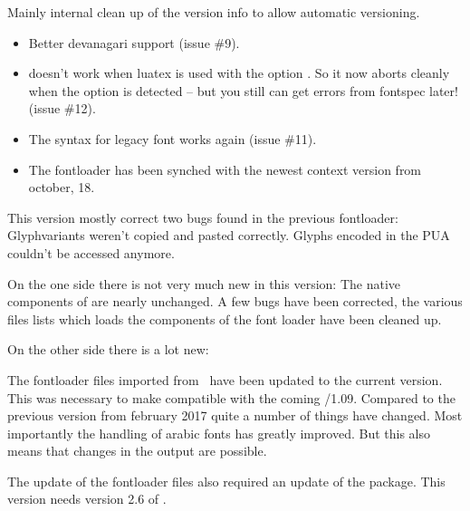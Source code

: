 Mainly internal clean up of the version info to allow automatic versioning.
\endsection


\begin{itemize}

  \item Better devanagari support (issue \#9).
  \item {} doesn't work when luatex is used with the option . So it now aborts cleanly when the option is detected -- but you still can get errors from fontspec later! (issue \#12).
  \item  The syntax  for legacy font works again (issue \#11).
  \item The fontloader has been synched with the newest context version from october, 18.
\end{itemize}
\endsection
{}

This version mostly correct two bugs found in the previous fontloader: Glyphvariants weren't copied and pasted correctly. Glyphs encoded in the PUA couldn't be accessed anymore.

\endsection



On the one side there is not very much new in this version: The native components of  are nearly unchanged. A few bugs have been corrected, the various files lists which loads the components of the font loader have been cleaned up.

On the other side there is a lot new:

\begindescriptions

   The fontloader files imported from \CONTEXT\ have been updated to the current version.
   This was necessary to make  compatible with the coming /1.09. Compared to the previous version from february 2017 quite a number of things have changed. Most importantly the handling of arabic fonts has greatly improved. But this also means that changes in the output are possible.
  \endaltitem

   The update of the fontloader files also required an update of the  package. This  version needs version 2.6 of .
  \endaltitem


